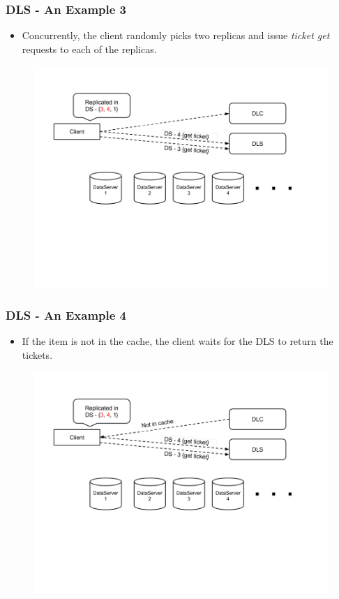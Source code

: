 \documentclass{beamer}
\begin{document}
\begin{frame}
  \frametitle{DLS - An Example 3}
  \begin{itemize}
    \item Concurrently, the client randomly picks two replicas and
      issue \textit{ticket get} requests to each of the replicas.
  \end{itemize}
  \begin{figure}
    \begin{center}
      \centerline{\includegraphics[scale=0.40]{img/DLS_Example4.png}}
    \end{center}
  \end{figure}
\end{frame}

\begin{frame}
  \frametitle{DLS - An Example 4}
  \begin{itemize}
    \item If the item is not in the cache, the client waits for the DLS to
      return the tickets.
  \end{itemize}
  \begin{figure}
    \begin{center}
      \centerline{\includegraphics[scale=0.40]{img/DLS_Example5.png}}
    \end{center}
  \end{figure}
\end{frame}
\end{document}
